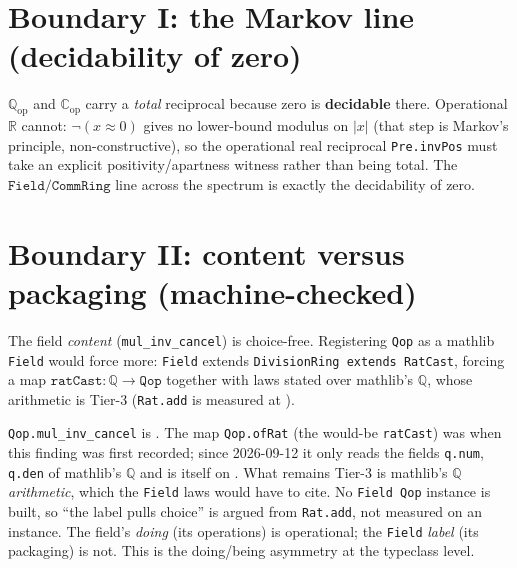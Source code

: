 \section{Boundary I: the Markov line (decidability of zero)}
\label{sec:continuum_markov}

$\mathbb{Q}_{\mathrm{op}}$ and $\mathbb{C}_{\mathrm{op}}$ carry a \emph{total}
reciprocal because zero is \textbf{decidable} there.  Operational $\mathbb{R}$ cannot:
$\lnot(x \approx 0)$ gives no lower-bound modulus on $|x|$ (that step is Markov's
principle, non-constructive), so the operational real reciprocal \texttt{Pre.invPos}
must take an explicit positivity/apartness witness rather than being total.  The
$\texttt{Field}/\texttt{CommRing}$ line across the spectrum is exactly the decidability
of zero.

\section{Boundary II: content versus packaging (machine-checked)}
\label{sec:continuum_typeclass}

The field \emph{content} (\texttt{mul\_inv\_cancel}) is choice-free.  Registering
\texttt{Qop} as a mathlib \texttt{Field} would force more: \texttt{Field} extends
\texttt{DivisionRing extends RatCast}, forcing a map
$\texttt{ratCast} : \mathbb{Q} \to \texttt{Qop}$ together with laws stated over
mathlib's $\mathbb{Q}$, whose arithmetic is Tier-3 (\texttt{Rat.add} is measured at
).

\begin{finding}
\label{find:continuum_packaging}
\leanok
{}
\texttt{Qop.mul\_inv\_cancel} is .  The map
\texttt{Qop.ofRat} (the would-be \texttt{ratCast}) was
 when this finding was first
recorded; since 2026-09-12 it only reads the fields \texttt{q.num}, \texttt{q.den} of
mathlib's $\mathbb{Q}$ and is itself on \axiomprofile{[]}.  What remains Tier-3 is
mathlib's $\mathbb{Q}$ \emph{arithmetic}, which the \texttt{Field} laws would have to
cite.  No \texttt{Field Qop} instance is built, so ``the label pulls choice'' is
argued from \texttt{Rat.add}, not measured on an instance.  The field's \emph{doing}
(its operations) is operational; the \texttt{Field} \emph{label} (its packaging) is
not.  This is the doing/being asymmetry at the typeclass level.
\end{finding}

